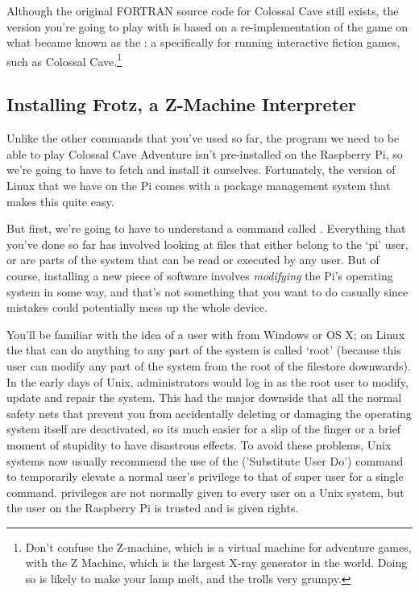 Although the original FORTRAN source code for Colossal Cave still exists, the version you're going to play with is based on a re-implementation of the game on what became known as the : a  specifically for running interactive fiction games, such as Colossal Cave.\footnote{Don't confuse the Z-machine, which is a virtual machine for adventure games, with the Z Machine, which is the largest X-ray generator in the world. Doing so is likely to make your lamp melt, and the trolls very grumpy.}

\FloatBarrier
\subsection{Installing Frotz, a Z-Machine Interpreter}

Unlike the other commands that you've used so far, the program we need to be able to play Colossal Cave Adventure isn't pre-installed on the Raspberry Pi, so we're going to have to fetch and install it ourselves. Fortunately, the version of Linux that we have on the Pi comes with a package management system that makes this quite easy.

But first, we're going to have to understand a command called . Everything that you've done so far has involved looking at files that either belong to the `pi' user, or are parts of the system that can be read or executed by any user. But of course, installing a new piece of software involves \textit{modifying} the Pi's operating system in some way, and that's not something that you want to do casually since mistakes could potentially mess up the whole device.

You'll be familiar with the idea of a user with  from Windows or OS X; on Linux the  that can do anything to any part of the system is called `root' (because this user can modify any part of the system from the root of the filestore downwards). In the early days of Unix, administrators would log in as the root user to modify, update and repair the system. This had the major downside that all the normal safety nets that prevent you from accidentally deleting or damaging the operating system itself are deactivated, so its much easier for a slip of the finger or a brief moment of stupidity to have disastrous effects. To avoid these problems, Unix systems now usually recommend the use of the  ('Substitute User Do') command to temporarily elevate a normal user's privilege to that of super user for a single command.  privileges are not normally given to every user on a Unix system, but the user  on the Raspberry Pi is trusted and is given  rights.


